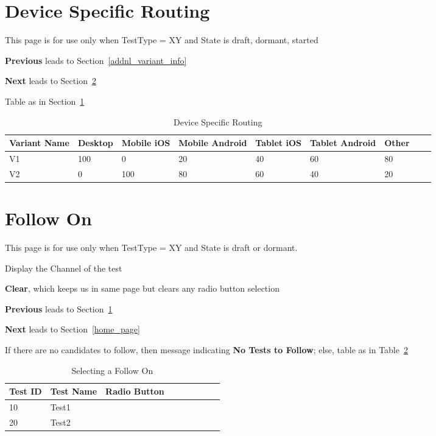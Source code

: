 \documentclass[letterpaper]{article}
\begin{document}
\section{Device Specific Routing}
\label{device_specific}
This page is for use only when TestType = XY and State is draft, dormant,
started
\be
\item {\bf Previous} leads to Section~\ref{addnl_variant_info}
\item {\bf Next} leads to Section~\ref{follow_on}
\item Table as in Section~\ref{tbl_device_specific}
  \ee
\begin{table}[hb]
\centering
\begin{tabular}{|l||l|l|l|l|l|l|l|l|}  \hline \hline
  {\bf Variant Name} & 
  {\bf Desktop} & 
  {\bf Mobile iOS}  &
  {\bf Mobile Android}  & 
  {\bf Tablet iOS}  & 
  Tablet {\bf Android}  &
  Other \\ \hline \hline
  V1 & 100  & 0   & 20 & 40 & 60 & 80 \\ \hline
  V2 & 0    & 100 &  80 & 60 & 40 & 20 \\ \hline
\hline
\end{tabular}
\caption{Device Specific Routing}
\label{tbl_device_specific}
\end{table}

\section{Follow On}
\label{follow_on}
This page is for use only when TestType = XY and State is draft or dormant.
\be
\item Display the Channel of the test
\item {\bf Clear}, which keeps us in same page but clears any radio button
  selection
\item {\bf Previous} leads to Section~\ref{device_specific}
\item {\bf Next} leads to Section~\ref{home_page}
\item If there are no candidates to follow, then message indicating {\bf No
  Tests to Follow}; else, table as in Table~\ref{tbl_follow_on}
  \ee

\begin{table}[hb]
\centering
\begin{tabular}{|l||l|l|l|l|l|l|l|l|}  \hline \hline
  {\bf Test ID } & {\bf Test Name} & {\bf Radio Button}\\ \hline 
  10 & Test1 & \\ \hline
  20 & Test2 & \\ \hline
\hline
\end{tabular}
\caption{Selecting a Follow On}
\label{tbl_follow_on}
\end{table}
\end{document}
